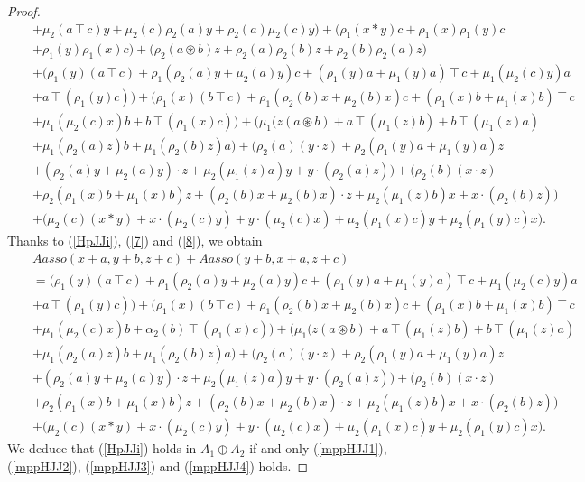 \documentclass[10pt,a4paper]{amsart}
\begin{document}
\begin{proof}
\begin{eqnarray}
			&&+\mu_2(a\intercal c)y+\mu_2(c)\rho_2(a)y+\rho_2(a)\mu_2(c)y \Big)+
			\Big(\rho_1(x\ast y)c+\rho_1(x)\rho_1(y)c\nonumber\\
			&&+ \rho_1(y)\rho_1(x)c\Big)+\Big(\rho_2(a\circledast b)z+\rho_2(a)\rho_2(b)z+ \rho_2(b)\rho_2(a)z\Big)\nonumber
		\end{eqnarray}
		\begin{eqnarray}		
			&&+
			\Big( \rho_1(y)(a\intercal c)+\rho_1(\rho_2(a)y+\mu_2(a)y)c+(\rho_1(y)a+\mu_1(y)a)\intercal c+\mu_1(\mu_2(c)y)a\nonumber\\
			&&+a\intercal(\rho_1(y)c)\Big)
			+\Big( \rho_1(x)(b\intercal c)+\rho_1(\rho_2(b)x+\mu_2(b)x)c+(\rho_1(x)b+\mu_1(x)b)\intercal c\nonumber\\
			&&+\mu_1(\mu_2(c)x)b
			+b\intercal(\rho_1(x)c)\Big)
			+\Big(\mu_1(z(a\circledast b)+a\intercal(\mu_1(z)b)+b\intercal(\mu_1(z)a)\nonumber\\
			&&+\mu_1(\rho_2(a)z)b+\mu_1(\rho_2(b)z)a   \Big)+
			\Big(\rho_2(a)(y\cdot z)+\rho_2(\rho_1(y)a+\mu_1(y)a)z\nonumber\\
			&&+(\rho_2(a)y+\mu_2(a)y)\cdot z+\mu_2(\mu_1(z)a)y+y\cdot(\rho_2(a)z) \Big)+\Big(\rho_2(b)(x\cdot z)\nonumber\\
			&&+\rho_2(\rho_1(x)b+\mu_1(x)b)z+(\rho_2(b)x+\mu_2(b)x)\cdot z+\mu_2(\mu_1(z)b)x+x\cdot(\rho_2(b)z) \Big)\nonumber\\
			&&+\Big(\mu_2(c)(x\ast y)+x\cdot(\mu_2(c)y)+y\cdot(\mu_2(c)x)
			+\mu_2(\rho_1(x)c)y+\mu_2(\rho_1(y)c)x \Big).\nonumber
		\end{eqnarray}
		Thanks to  (\ref{HpJJi}), (\ref{7}) and (\ref{8}), we obtain
		\begin{eqnarray}
			&&Aasso(x+a,y+b,z+c)+Aasso(y+b,x+a,z+c)
			\nonumber\\ 
			&&=\Big( \rho_1(y)(a\intercal c)+\rho_1(\rho_2(a)y+\mu_2(a)y)c+(\rho_1(y)a+\mu_1(y)a)\intercal c+\mu_1(\mu_2(c)y)a\nonumber\\
			&&+a\intercal(\rho_1(y)c)\Big)
			+\Big( \rho_1(x)(b\intercal c)+\rho_1(\rho_2(b)x+\mu_2(b)x)c+(\rho_1(x)b+\mu_1(x)b)\intercal c\nonumber\\
			&&+\mu_1(\mu_2(c)x)b
			+\alpha_2(b)\intercal(\rho_1(x)c)
			\Big)
			+\Big(\mu_1(z(a\circledast b)+a\intercal(\mu_1(z)b)+b\intercal(\mu_1(z)a)\nonumber\\
			&&+\mu_1(\rho_2(a)z)b+\mu_1(\rho_2(b)z)a   \Big)+
			\Big(\rho_2(a)(y\cdot z)+\rho_2(\rho_1(y)a+\mu_1(y)a)z\nonumber\\
			&&+(\rho_2(a)y+\mu_2(a)y)\cdot z+\mu_2(\mu_1(z)a)y+y\cdot(\rho_2(a)z) \Big)+\Big(\rho_2(b)(x\cdot z)\nonumber\\
			&&+\rho_2(\rho_1(x)b+\mu_1(x)b)z+(\rho_2(b)x+\mu_2(b)x)\cdot z+\mu_2(\mu_1(z)b)x+x\cdot(\rho_2(b)z) \Big)\nonumber\\
			&&+\Big(\mu_2(c)(x\ast y)+x\cdot(\mu_2(c)y)+y\cdot(\mu_2(c)x)
			+\mu_2(\rho_1(x)c)y+\mu_2(\rho_1(y)c)x \Big).\nonumber
		\end{eqnarray}
		We deduce that (\ref{HpJJi}) holds in $A_1\oplus A_2$  if and only (\ref{mppHJJ1}), (\ref{mppHJJ2}), (\ref{mppHJJ3}) and (\ref{mppHJJ4}) holds.
	\end{proof}
\end{document}
